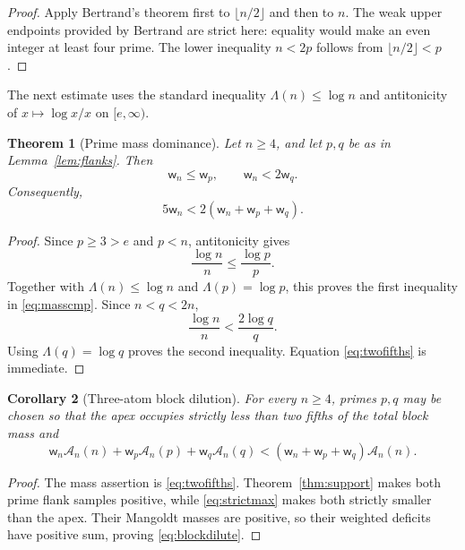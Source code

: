 \documentclass[11pt]{article}
\newtheorem{theorem}{Theorem}[section]
\newtheorem{corollary}[theorem]{Corollary}
\newcommand{\Lam}{\Lambda}
\newcommand{\A}{\mathcal A}
\newcommand{\w}{\mathsf w}
\begin{document}
\begin{proof}
Apply Bertrand's theorem first to $\lfloor n/2\rfloor$ and then to $n$.  The weak upper endpoints
provided by Bertrand are strict here: equality would make an even integer at least four prime.
The lower inequality $n<2p$ follows from $\lfloor n/2\rfloor<p$.
\end{proof}

The next estimate uses the standard inequality $\Lam(n)\le\log n$ and antitonicity of
$x\mapsto\log x/x$ on $[e,\infty)$.

\begin{theorem}[Prime mass dominance]\label{thm:mass}
Let $n\ge4$, and let $p,q$ be as in Lemma~\ref{lem:flanks}.  Then
\begin{equation}\label{eq:masscmp}
 \w_n\le\w_p,\qquad \w_n<2\w_q.
\end{equation}
Consequently,
\begin{equation}\label{eq:twofifths}
 5\w_n<2(\w_n+\w_p+\w_q).
\end{equation}
\end{theorem}

\begin{proof}
Since $p\ge3>e$ and $p<n$, antitonicity gives
\[
 \frac{\log n}{n}\le\frac{\log p}{p}.
\]
Together with $\Lam(n)\le\log n$ and $\Lam(p)=\log p$, this proves the first inequality in
\eqref{eq:masscmp}.  Since $n<q<2n$,
\[
 \frac{\log n}{n}<\frac{2\log q}{q}.
\]
Using $\Lam(q)=\log q$ proves the second inequality.  Equation \eqref{eq:twofifths} is immediate.
\end{proof}

\begin{corollary}[Three-atom block dilution]\label{cor:primeblock}
For every $n\ge4$, primes $p,q$ may be chosen so that the apex occupies strictly less than two
fifths of the total block mass and
\begin{equation}\label{eq:blockdilute}
 \w_n\A_n(n)+\w_p\A_n(p)+\w_q\A_n(q)
 <(\w_n+\w_p+\w_q)\A_n(n).
\end{equation}
\end{corollary}

\begin{proof}
The mass assertion is \eqref{eq:twofifths}.  Theorem~\ref{thm:support} makes both prime flank
samples positive, while \eqref{eq:strictmax} makes both strictly smaller than the apex.  Their
Mangoldt masses are positive, so their weighted deficits have positive sum, proving
\eqref{eq:blockdilute}.
\end{proof}
\end{document}

